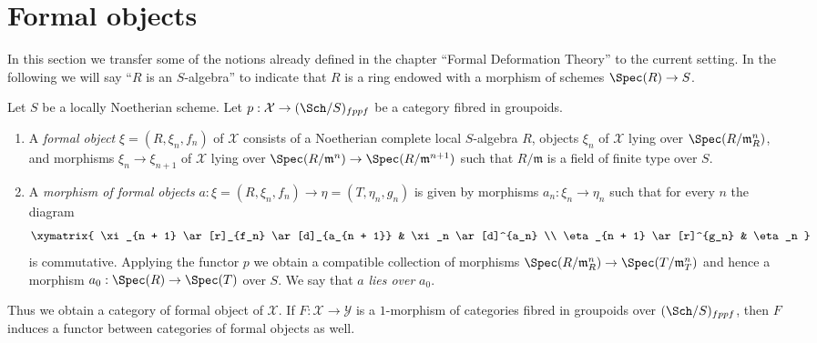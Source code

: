 \section{Formal objects}
\label{section-formal-objects}

\noindent
In this section we transfer some of the notions already defined
in the chapter ``Formal Deformation Theory'' to the current setting.
In the following we will say ``$R$ is an $S$-algebra'' to indicate
that $R$ is a ring endowed with a morphism of schemes $\Spec(R) \to S$.

\begin{definition}
\label{definition-formal-objects}
Let $S$ be a locally Noetherian scheme. Let
$p : \mathcal{X} \to (\Sch/S)_{fppf}$ be a category fibred in groupoids.
\begin{enumerate}
\item A {\it formal object} $\xi = (R, \xi_n, f_n)$ of $\mathcal{X}$ consists
of a Noetherian complete local $S$-algebra $R$, objects $\xi_n$ of
$\mathcal{X}$ lying over $\Spec(R/\mathfrak m_R^n)$, and morphisms
$\xi_n \to \xi_{n + 1}$ of $\mathcal{X}$ lying over
$\Spec(R/\mathfrak m^n) \to \Spec(R/\mathfrak m^{n + 1})$
such that $R/\mathfrak m$ is a field of finite type over $S$.
\item A {\it morphism of formal objects}
$a : \xi = (R, \xi_n, f_n) \to \eta = (T, \eta_n, g_n)$
is given by morphisms $a_n : \xi_n \to \eta_n$ such that for every $n$
the diagram
$$
\xymatrix{
\xi_{n + 1} \ar[r]_{f_n} \ar[d]_{a_{n + 1}} & \xi_n \ar[d]^{a_n} \\
\eta_{n + 1} \ar[r]^{g_n} & \eta_n
}
$$
is commutative. Applying the functor $p$ we obtain a compatible collection
of morphisms $\Spec(R/\mathfrak m_R^n) \to \Spec(T/\mathfrak m_T^n)$ and
hence a morphism $a_0 : \Spec(R) \to \Spec(T)$ over $S$. We say that
$a$ {\it lies over} $a_0$.
\end{enumerate}
\end{definition}

\noindent
Thus we obtain a category of formal object of $\mathcal{X}$. If
$F : \mathcal{X} \to \mathcal{Y}$ is a $1$-morphism of categories fibred
in groupoids over $(\Sch/S)_{fppf}$, then $F$ induces a functor between
categories of formal objects as well.

